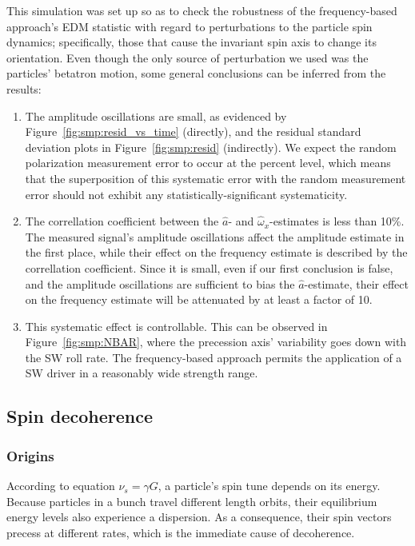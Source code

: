 \documentclass[]{elsarticle}
\newcommand{\w}{\omega}
\begin{document}
This simulation was set up so as to check the robustness of the frequency-based approach's EDM statistic
with regard to perturbations to the particle spin dynamics; specifically, those that cause the invariant
spin axis to change its orientation. Even though the only source of perturbation we used was
the particles' betatron motion, some general conclusions can be inferred from the results:
\begin{enumerate}[(1)]
\item The amplitude oscillations are small, as evidenced by Figure~\ref{fig:smp:resid_vs_time} (directly),
  and the residual standard deviation plots in Figure~\ref{fig:smp:resid} (indirectly). We expect the
  random polarization measurement error to occur at the percent level, which means that the superposition
  of this systematic error with the random measurement error should not exhibit any
  statistically-significant systematicity.
\item The correllation coefficient between the $\hat a$- and $\hat\w_x$-estimates is less than 10\%.
  The measured signal's amplitude oscillations affect the amplitude estimate in the first place, while
  their effect on the frequency estimate is described by the correllation coefficient. Since it is small,
  even if our first conclusion is false, and the amplitude oscillations are sufficient to bias the
  $\hat a$-estimate, their effect on the frequency estimate will be attenuated by at least a factor of 10.
\item This systematic effect is controllable. This can be observed in Figure~\ref{fig:smp:NBAR}, where
  the precession axis' variability goes down with the SW roll rate. The frequency-based approach permits
  the application of a SW driver in a reasonably wide strength range.
\end{enumerate}

\subsection{Spin decoherence}
\subsubsection{Origins}
According to equation $\nu_s = \gamma G$, a particle's spin tune depends on its energy. Because particles in
a bunch travel different length orbits, their equilibrium energy levels also experience a dispersion. As a
consequence, their spin vectors precess at different rates, which is the immediate cause of decoherence.
\end{document}
